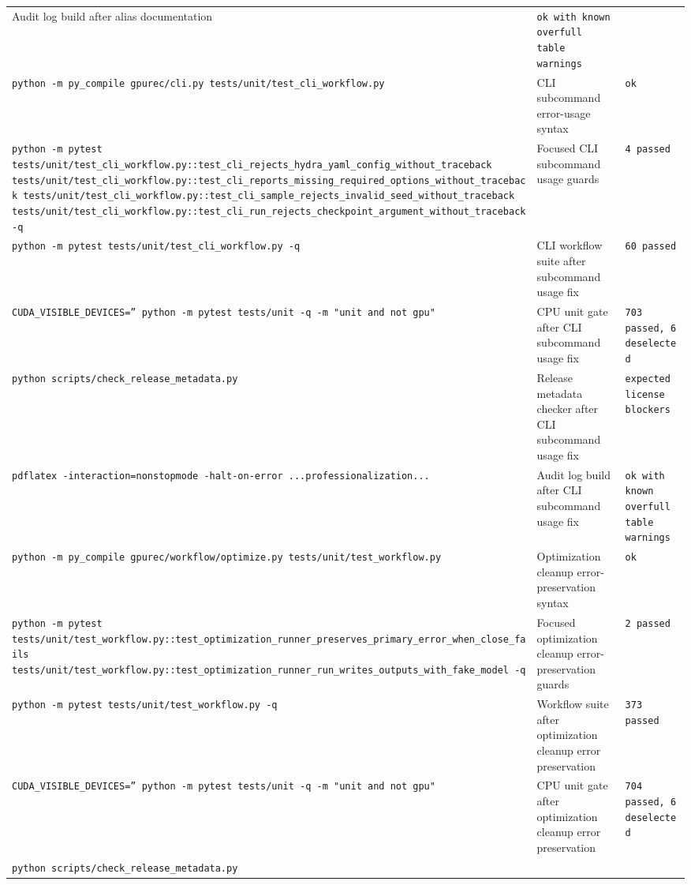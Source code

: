 \documentclass[11pt]{article}
\begin{document}
\begin{center}
\begin{tabular}{lll}
Audit log build after alias documentation &
\texttt{ok with known overfull table warnings} \\
\texttt{python -m py\_compile gpurec/cli.py tests/unit/test\_cli\_workflow.py} &
CLI subcommand error-usage syntax &
\texttt{ok} \\
\texttt{python -m pytest tests/unit/test\_cli\_workflow.py::test\_cli\_rejects\_hydra\_yaml\_config\_without\_traceback tests/unit/test\_cli\_workflow.py::test\_cli\_reports\_missing\_required\_options\_without\_traceback tests/unit/test\_cli\_workflow.py::test\_cli\_sample\_rejects\_invalid\_seed\_without\_traceback tests/unit/test\_cli\_workflow.py::test\_cli\_run\_rejects\_checkpoint\_argument\_without\_traceback -q} &
Focused CLI subcommand usage guards &
\texttt{4 passed} \\
\texttt{python -m pytest tests/unit/test\_cli\_workflow.py -q} &
CLI workflow suite after subcommand usage fix &
\texttt{60 passed} \\
\texttt{CUDA\_VISIBLE\_DEVICES='' python -m pytest tests/unit -q -m "unit and not gpu"} &
CPU unit gate after CLI subcommand usage fix &
\texttt{703 passed, 6 deselected} \\
\texttt{python scripts/check\_release\_metadata.py} &
Release metadata checker after CLI subcommand usage fix &
\texttt{expected license blockers} \\
\texttt{pdflatex -interaction=nonstopmode -halt-on-error ...professionalization...} &
Audit log build after CLI subcommand usage fix &
\texttt{ok with known overfull table warnings} \\
\texttt{python -m py\_compile gpurec/workflow/optimize.py tests/unit/test\_workflow.py} &
Optimization cleanup error-preservation syntax &
\texttt{ok} \\
\texttt{python -m pytest tests/unit/test\_workflow.py::test\_optimization\_runner\_preserves\_primary\_error\_when\_close\_fails tests/unit/test\_workflow.py::test\_optimization\_runner\_run\_writes\_outputs\_with\_fake\_model -q} &
Focused optimization cleanup error-preservation guards &
\texttt{2 passed} \\
\texttt{python -m pytest tests/unit/test\_workflow.py -q} &
Workflow suite after optimization cleanup error preservation &
\texttt{373 passed} \\
\texttt{CUDA\_VISIBLE\_DEVICES='' python -m pytest tests/unit -q -m "unit and not gpu"} &
CPU unit gate after optimization cleanup error preservation &
\texttt{704 passed, 6 deselected} \\
\texttt{python scripts/check\_release\_metadata.py} &

\end{tabular}
\end{center}
\end{document}
